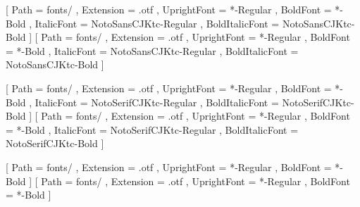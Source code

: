 \usepackage{newtxtext}
\usepackage{amsmath}
\usepackage{amsthm}

\usepackage{notomath}
\usepackage{xeCJK}

[
	Path			= fonts/ ,
	Extension		= .otf ,
	UprightFont		= *-Regular ,
	BoldFont		= *-Bold ,
	ItalicFont		= NotoSansCJKtc-Regular ,
	BoldItalicFont	= NotoSansCJKtc-Bold
]
\setmainfont{NotoSerifCJKtc}[
	Path			= fonts/ ,
	Extension		= .otf ,
	UprightFont		= *-Regular ,
	BoldFont		= *-Bold ,
	ItalicFont		= NotoSansCJKtc-Regular ,
	BoldItalicFont	= NotoSansCJKtc-Bold
]

[
	Path			= fonts/ ,
	Extension		= .otf ,
	UprightFont		= *-Regular ,
	BoldFont		= *-Bold ,
	ItalicFont		= NotoSerifCJKtc-Regular ,
	BoldItalicFont	= NotoSerifCJKtc-Bold
]
\setsansfont{NotoSansCJKtc}[
	Path			= fonts/ ,
	Extension		= .otf ,
	UprightFont		= *-Regular ,
	BoldFont		= *-Bold ,
	ItalicFont		= NotoSerifCJKtc-Regular ,
	BoldItalicFont	= NotoSerifCJKtc-Bold
]

[
	Path		= fonts/ ,
	Extension	= .otf ,
	UprightFont	= *-Regular ,
	BoldFont	= *-Bold
]
\setmonofont{NotoSansMonoCJKtc}[
	Path		= fonts/ ,
	Extension	= .otf ,
	UprightFont	= *-Regular ,
	BoldFont	= *-Bold
]
